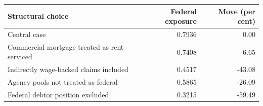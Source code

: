 \begin{tabular}{lrr}
\toprule
Structural choice & Federal exposure & Move (per cent) \\
\midrule
Central case & 0.7936 & 0.00 \\
Commercial mortgage treated as rent-serviced & 0.7408 & -6.65 \\
Indirectly wage-backed claims included & 0.4517 & -43.08 \\
Agency pools not treated as federal & 0.5865 & -26.09 \\
Federal debtor position excluded & 0.3215 & -59.49 \\
\bottomrule
\end{tabular}
